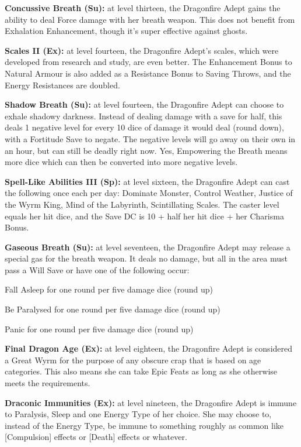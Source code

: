 \textbf{Concussive Breath (Su):} at level thirteen, the Dragonfire Adept gains the ability to deal Force damage with her breath weapon. This does not benefit from Exhalation Enhancement, though it's super effective against ghosts. 

\textbf{Scales II (Ex):} at level fourteen, the Dragonfire Adept's scales, which were developed from research and study, are even better. The Enhancement Bonus to Natural Armour is also added as a Resistance Bonus to Saving Throws, and the Energy Resistances are doubled. 

\textbf{Shadow Breath (Su):} at level fourteen, the Dragonfire Adept can choose to exhale shadowy darkness. Instead of dealing damage with a save for half, this deals 1 negative level for every 10 dice of damage it would deal (round down), with a Fortitude Save to negate. The negative levels will go away on their own in an hour, but can still be deadly right now. Yes, Empowering the Breath means more dice which can then be converted into more negative levels. 

\textbf{Spell-Like Abilities III (Sp):} at level sixteen, the Dragonfire Adept can cast the following once each per day: Dominate Monster, Control Weather, Justice of the Wyrm King, Mind of the Labyrinth, Scintillating Scales. The caster level equals her hit dice, and the Save DC is 10 + half her hit dice + her Charisma Bonus. 

\textbf{Gaseous Breath (Su):} at level seventeen, the Dragonfire Adept may release a special gas for the breath weapon. It deals no damage, but all in the area must pass a Will Save or have one of the following occur:

\begin{itemize*}
\item Fall Asleep for one round per five damage dice (round up) 
\item Be Paralysed for one round per five damage dice (round up) 
\item Panic for one round per five damage dice (round up)
\end{itemize*}

\textbf{Final Dragon Age (Ex):} at level eighteen, the Dragonfire Adept is considered a Great Wyrm for the purpose of any obscure crap that is based on age categories. This also means she can take Epic Feats as long as she otherwise meets the requirements. 

\textbf{Draconic Immunities (Ex):} at level nineteen, the Dragonfire Adept is immune to Paralysis, Sleep and one Energy Type of her choice. She may choose to, instead of the Energy Type, be immune to something roughly as common like [Compulsion] effects or [Death] effects or whatever. 

